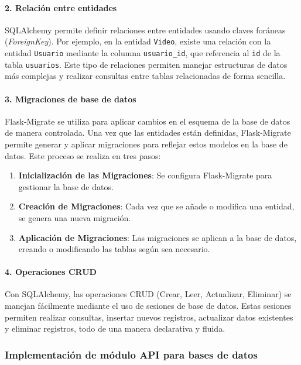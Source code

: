 \paragraph*{2. Relación entre entidades}
SQLAlchemy permite definir relaciones entre entidades usando claves foráneas (\textit{ForeignKey}). Por ejemplo, en la entidad \texttt{Video}, existe una relación con la entidad \texttt{Usuario} mediante la columna \texttt{usuario\_id}, que referencia al \texttt{id} de la tabla \texttt{usuarios}. Este tipo de relaciones permiten manejar estructuras de datos más complejas y realizar consultas entre tablas relacionadas de forma sencilla.

\paragraph*{3. Migraciones de base de datos}
Flask-Migrate se utiliza para aplicar cambios en el esquema de la base de datos de manera controlada. Una vez que las entidades están definidas, Flask-Migrate permite generar y aplicar migraciones para reflejar estos modelos en la base de datos. Este proceso se realiza en tres pasos:

\begin{enumerate}[label=\alph*.]
    \item \textbf{Inicialización de las Migraciones}: Se configura Flask-Migrate para gestionar la base de datos.
    \item \textbf{Creación de Migraciones}: Cada vez que se añade o modifica una entidad, se genera una nueva migración.
    \item \textbf{Aplicación de Migraciones}: Las migraciones se aplican a la base de datos, creando o modificando las tablas según sea necesario.
\end{enumerate}

\paragraph*{4. Operaciones CRUD}
Con SQLAlchemy, las operaciones CRUD (Crear, Leer, Actualizar, Eliminar) se manejan fácilmente mediante el uso de sesiones de base de datos. Estas sesiones permiten realizar consultas, insertar nuevos registros, actualizar datos existentes y eliminar registros, todo de una manera declarativa y fluida.

\subsubsection{Implementación de módulo API para bases de datos}

